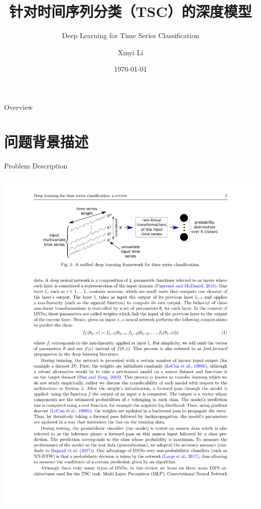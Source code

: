 \documentclass[aspectratio=169]{ctexbeamer}
\title{针对时间序列分类（TSC）的深度模型}
\subtitle{Deep Learning for Time Series Classification \footfullcite{fawaz2019deep}}
\author{Xinyi Li}
\date{\today}
\begin{document}
\begin{frame}
	\titlepage
\end{frame}

\begin{frame}{Overview}
  \tableofcontents
\end{frame}

\section{问题背景描述}

\begin{frame}{Problem Description}
	\begin{center}
		\includegraphics[width=\textwidth]{figure/base_formula}
	\end{center}
\end{frame}
\end{document}
